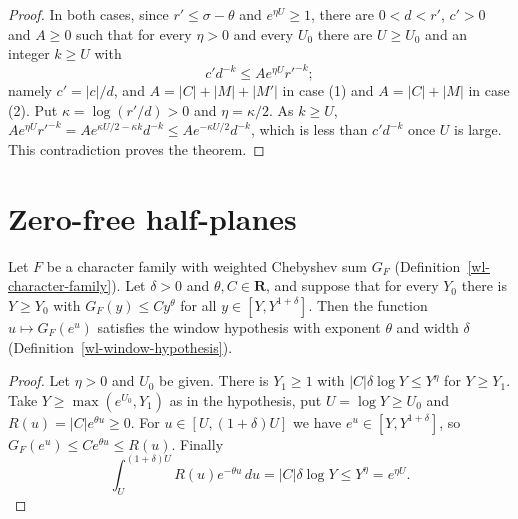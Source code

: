 \begin{proof}
In both cases, since $r'\leq\sigma-\theta$ and $e^{\eta U}\geq1$, there are
$0<d<r'$, $c'>0$ and $A\geq0$ such that for every $\eta>0$ and every $U_0$
there are $U\geq U_0$ and an integer $k\geq U$ with
\[
 c'd^{-k}\leq Ae^{\eta U}r'^{-k};
\]
namely $c'=|c|/d$, and $A=|C|+|M|+|M'|$ in case (1) and $A=|C|+|M|$ in
case (2). Put $\kappa=\log(r'/d)>0$ and $\eta=\kappa/2$. As $k\geq U$,
$Ae^{\eta U}r'^{-k}=Ae^{\kappa U/2-\kappa k}d^{-k}\leq Ae^{-\kappa U/2}d^{-k}$,
which is less than $c'd^{-k}$ once $U$ is large. This contradiction proves the
theorem.
\end{proof}

\section{Zero-free half-planes}\label{section-wl-zero-free}

\begin{lemma}\label{wl-power-window}
Let $F$ be a character family with weighted Chebyshev sum $G_F$
(Definition~\ref{wl-character-family}). Let $\delta>0$ and
$\theta,C\in\mathbf R$, and suppose that for every $Y_0$ there is $Y\geq Y_0$
with $G_F(y)\leq Cy^\theta$ for all $y\in[Y,Y^{1+\delta}]$. Then the function
$u\mapsto G_F(e^u)$ satisfies the window hypothesis with exponent $\theta$
and width $\delta$ (Definition~\ref{wl-window-hypothesis}).
\end{lemma}
\begin{proof}
Let $\eta>0$ and $U_0$ be given. There is $Y_1\geq1$ with
$|C|\delta\log Y\leq Y^\eta$ for $Y\geq Y_1$. Take $Y\geq\max(e^{U_0},Y_1)$ as
in the hypothesis, put $U=\log Y\geq U_0$ and $R(u)=|C|e^{\theta u}\geq0$. For
$u\in[U,(1+\delta)U]$ we have $e^u\in[Y,Y^{1+\delta}]$, so
$G_F(e^u)\leq Ce^{\theta u}\leq R(u)$. Finally
\[
 \int_U^{(1+\delta)U}R(u)e^{-\theta u}\,du=|C|\delta\log Y\leq Y^\eta=e^{\eta U}.
\]
\end{proof}

